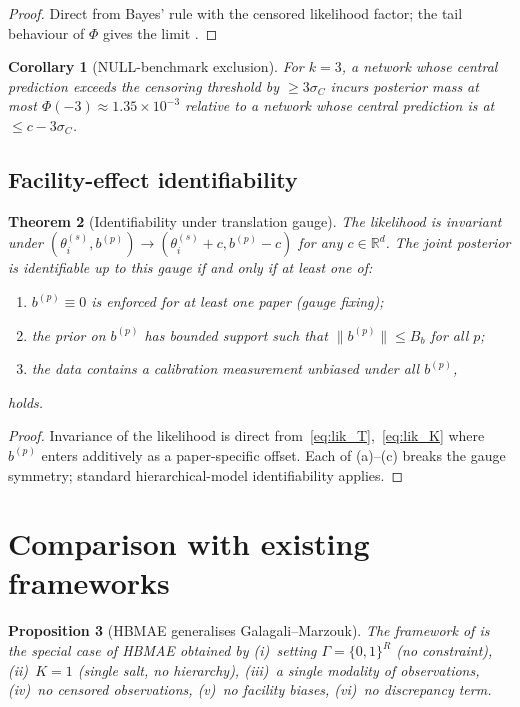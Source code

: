 \documentclass[11pt]{article}
\newtheorem{theorem}{Theorem}
\newtheorem{proposition}[theorem]{Proposition}
\newtheorem{corollary}[theorem]{Corollary}
\theoremstyle{definition}
\theoremstyle{remark}
\newcommand{\R}{\mathbb{R}}
\newcommand{\norm}[1]{\lVert #1 \rVert}
\newcommand{\HBMAE}{HBMAE\xspace}
\begin{document}
\begin{proof}
Direct from Bayes' rule with the censored likelihood factor; the tail behaviour of $\Phi$
gives the limit \citep{Tobin1958}.
\end{proof}

\begin{corollary}[NULL-benchmark exclusion]\label{cor:null}
For $k=3$, a network whose central prediction exceeds the censoring threshold by $\ge 3\sigma_C$
incurs posterior mass at most $\Phi(-3)\approx 1.35\times 10^{-3}$ relative to a network
whose central prediction is at $\le c-3\sigma_C$.
\end{corollary}

\subsection{Facility-effect identifiability}

\begin{theorem}[Identifiability under translation gauge]\label{thm:facility}
The likelihood is invariant under $(\theta_i^{(s)},b^{(p)})\to(\theta_i^{(s)}+c,b^{(p)}-c)$
for any $c\in\R^d$. The joint posterior is identifiable up to this gauge if and only if at
least one of:
\begin{enumerate}[label=(\alph*)]
  \item $b^{(p)}\equiv 0$ is enforced for at least one paper (gauge fixing);
  \item the prior on $b^{(p)}$ has bounded support such that $\norm{b^{(p)}}\le B_b$ for all $p$;
  \item the data contains a calibration measurement unbiased under all $b^{(p)}$,
\end{enumerate}
holds.
\end{theorem}

\begin{proof}
Invariance of the likelihood is direct from~\eqref{eq:lik_T},~\eqref{eq:lik_K} where
$b^{(p)}$ enters additively as a paper-specific offset. Each of (a)--(c) breaks the gauge
symmetry; standard hierarchical-model identifiability \citep[Ch.~6]{vdVaart1998} applies.
\end{proof}

\section{Comparison with existing frameworks}\label{sec:comparison}

\begin{proposition}[\HBMAE generalises Galagali--Marzouk]\label{prop:gm}
The framework of \citet{GalagaliMarzouk2015} is the special case of \HBMAE obtained by
(i)~setting $\Gamma=\{0,1\}^R$ (no constraint), (ii)~$K=1$ (single salt, no hierarchy),
(iii)~a single modality of observations, (iv)~no censored observations, (v)~no facility
biases, (vi)~no discrepancy term.
\end{proposition}
\end{document}
